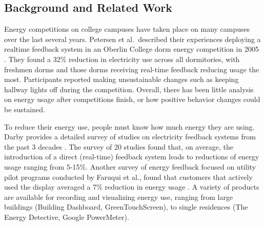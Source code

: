 \documentclass{chi-ext}
\begin{document}
\begin{multicols}{2}
\section{Background and Related Work}

%

Energy competitions on college campuses have taken place on many campuses over the last several years. Petersen et al.\ described their experiences deploying a realtime feedback system in an Oberlin College dorm energy competition in 2005 \cite{petersen-dorm-energy-reduction}. They found a 32\% reduction in electricity use across all dormitories, with freshmen dorms and those dorms receiving real-time feedback reducing usage the most. Participants reported making unsustainable changes such as keeping hallway lights off during the competition. Overall, there has been little analysis on energy usage after competitions finish, or how positive behavior changes could be sustained.

To reduce their energy use, people must know how much energy they are using. Darby provides a detailed survey of studies on electricity feedback systems from the past 3 decades \cite{darby-review-2006}. The survey of 20 studies found that, on average, the introduction of a direct (real-time) feedback system leads to reductions of energy usage ranging from 5-15\%. Another survey of energy feedback focused on utility pilot programs conducted by Faruqui et al., found that customers that actively used the display averaged a 7\% reduction in energy usage \cite{Faruqui09}. A variety of products are available for recording and visualizing energy use, ranging from large buildings (Building Dashboard, GreenTouchScreen), to single residences (The Energy Detective, Google PowerMeter).


\end{multicols}
\end{document}
